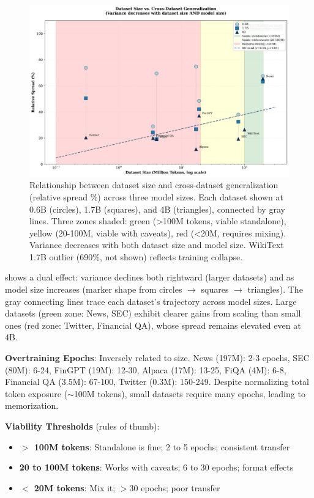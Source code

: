 \begin{figure}[h]
\centering
\includegraphics[width=\textwidth]{figures/scatter_size_variance.png}
\caption[Dataset Size vs. Generalization Across Model Scales]{Relationship between dataset size and cross-dataset generalization (relative spread \%) across three model sizes. Each dataset shown at 0.6B (circles), 1.7B (squares), and 4B (triangles), connected by gray lines. Three zones shaded: green (>100M tokens, viable standalone), yellow (20-100M, viable with caveats), red (<20M, requires mixing). Variance decreases with both dataset size and model size. WikiText 1.7B outlier (690\%, not shown) reflects training collapse.}
\label{fig:scatter_size_variance}
\end{figure}

 shows a dual effect: variance declines both rightward (larger datasets) and as model size increases (marker shape from circles \(\to\) squares \(\to\) triangles). The gray connecting lines trace each dataset's trajectory across model sizes. Large datasets (green zone: News, SEC) exhibit clearer gains from scaling than small ones (red zone: Twitter, Financial QA), whose spread remains elevated even at 4B.

\textbf{Overtraining Epochs}: Inversely related to size. News (197M): 2-3 epochs, SEC (80M): 6-24, FinGPT (19M): 12-30, Alpaca (17M): 13-25, FiQA (4M): 6-8, Financial QA (3.5M): 67-100, Twitter (0.3M): 150-249. Despite normalizing total token exposure ($\sim$100M tokens), small datasets require many epochs, leading to memorization.

\textbf{Viability Thresholds} (rules of thumb):
\begin{itemize}
\item \textbf{$>$ 100M tokens}: Standalone is fine; 2 to 5 epochs; consistent transfer
\item \textbf{20 to 100M tokens}: Works with caveats; 6 to 30 epochs; format effects
\item \textbf{$<$ 20M tokens}: Mix it; $>$30 epochs; poor transfer
\end{itemize}

